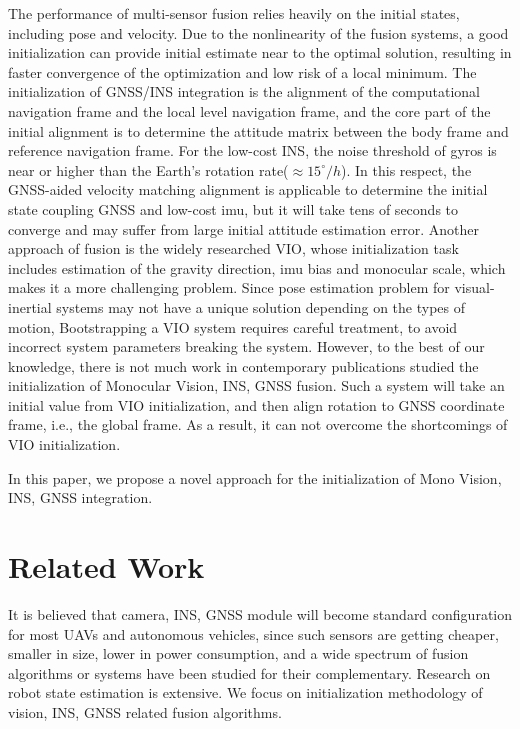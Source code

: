 \documentclass[journal,article,submit,moreauthors,pdftex]{Definitions/mdpi}
\begin{document}
The performance of multi-sensor fusion relies heavily on the initial states, including pose and velocity. Due to the nonlinearity of the fusion systems,  a good initialization can provide initial estimate near to the optimal solution, resulting in faster convergence of the optimization and low risk of a local minimum\cite{harsanyiMASATFastRobust2019}. The initialization of GNSS/INS integration is the alignment of the computational navigation frame and the local level navigation frame, and the core part of the initial alignment is to determine the attitude matrix between the body frame and reference navigation frame. For the low-cost INS, the noise threshold of gyros is near
or higher than the Earth’s rotation rate($\approx{15^{\circ}/h}$). In this respect, the GNSS-aided velocity matching alignment is applicable to determine the initial state coupling GNSS and low-cost imu, but it will take tens of seconds to converge and may suffer from large initial attitude estimation error\cite{huangNewFastInMotion2018}. Another approach of fusion is the widely researched VIO, whose initialization task includes  estimation of the gravity direction, imu bias and monocular scale, which makes it a more challenging problem. Since pose estimation problem for visual-inertial systems may not have a unique solution depending on the types of motion\cite{martinelliClosedFormSolutionVisualInertial2014}, Bootstrapping a VIO system requires careful treatment, to avoid incorrect system parameters breaking the system. However, to the best of our knowledge, there is not much work in contemporary publications studied the initialization of Monocular Vision, INS, GNSS fusion. Such a system will take  an initial value from VIO initialization, and then align rotation to GNSS coordinate frame, i.e., the global frame. As a result, it can not overcome the shortcomings of VIO initialization.

In this paper, we propose a novel approach for the initialization of Mono Vision, INS, GNSS integration.
 
\section{Related Work}

It is believed that camera, INS, GNSS module will become standard configuration for most UAVs and autonomous vehicles, since such sensors are getting cheaper, smaller in size, lower in power consumption, and a wide spectrum of fusion algorithms or systems have been studied for their complementary. Research on robot state estimation is extensive. We focus on initialization methodology of vision, INS, GNSS related fusion algorithms. 
\end{document}

